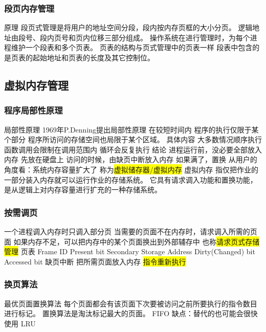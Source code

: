 \documentclass{ctexart}
\newcommand{\hl}[1]{\colorbox{yellow}{#1}}
\begin{document}
\subsubsection{段页内存管理}
\begin{outline}
    \1 原理
        \2 段页式管理是将用户的地址空间分段，段内按内存页框的大小分页。
        \2 逻辑地址由段号、段内页号和页内位移三部分组成。
        \2 操作系统在进行管理时，为每个进程维护一个段表和多个页表。
        \2 页表的结构与页式管理中的页表一样
        \2 段表中包含的是页表的起始地址和页表的长度及其它控制位。
\end{outline}
\subsection{虚拟内存管理}
\subsubsection{程序局部性原理}
\begin{outline}
    \1 局部性原理
        \2 1969年P.Denning提出局部性原理
        \2 在较短时间内
        \2 程序的执行仅限于某个部分
        \2 程序所访问的存储空间也局限于某个区域。
    \1 具体内容
        \2 大多数情况顺序执行
        \2 函数调用会限制在调用范围内
        \2 循环会反复执行
    \1 结论
        \2 进程运行前，没必要全部放入内存
            \3 先放在硬盘上
            \3 访问的时候，由缺页中断放入内存
            \3 如果满了，置换
        \2 从用户的角度看：系统内存容量扩大了
            \3 称为\hl{虚拟储存器/虚拟内存}
    \1 虚拟内存
        \2 指仅把作业的一部分装入内存就可以运行作业的存储系统。
        \2 它具有请求调入功能和置换功能，是从逻辑上对内存容量进行扩充的一种存储系统。
\end{outline}

\subsubsection{按需调页}
\begin{outline}
    \1 一个进程调入内存时只调入部分页
        \2 当需要的页面不在内存时，请求调入所需的页面
        \2 如果内存不足，可以把内存中的某个页面换出到外部辅存中
        \2 也称\hl{请求页式存储管理}
    \1 页表
        \2 Frame ID
        \2 Present bit
        \2 Secondary Storage Address
        \2 Dirty(Changed) bit
        \2 Accessed bit
    \1 缺页中断
        \2 把所需页面放入内存
        \2 \hl{指令重新执行}
\end{outline}

\subsubsection{换页算法}
\begin{outline}
    \1 最优页面置换算法
        \2 每个页面都会有该页面下次要被访问之前所要执行的指令数目进行标记。
        \2 置换算法是淘汰标记最大的页面。
    \1 FIFO
        \2 缺点：替代的也可能会很快使用
    \1 LRU
\end{outline}
\end{document}

